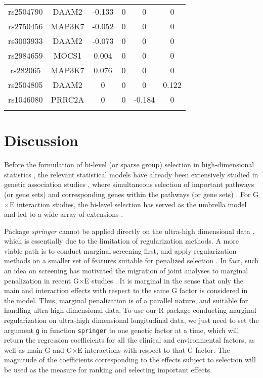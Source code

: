 \documentclass[12pt]{article}
\begin{document}
\begin{longtable} [ht!]{c c c c c c}
	rs2504790&DAAM2	&-0.133&	0&	0&	0\\
	
	rs2750456&MAP3K7	&-0.052&	0&	0&	0\\
	
	rs3003933&DAAM2	&-0.073&	0&	0&	0\\
	
	rs2984659&MOCS1	&0.004&	0&	0&	0\\
	
	rs282065&MAP3K7	&0.076&	0&	0&	0\\
	
	rs2504805&DAAM2	&0&	0&	0&	0.122\\
	
	rs1046080&PRRC2A	&0&	0&	-0.184&	0\\	
	\hline 
	\centering
\end{longtable}




\section{Discussion}

Before the formulation of bi-level (or sparse group) selection in high-dimensional statistics \cite{friedman2010note}, the relevant statistical models have already been extensively studied in genetic association studies \cite{lewis2002genetic,wu2012genetic}, where simultaneous selection of important pathways (or gene sets) and corresponding genes within the pathways (or gene sets) \cite{schaid2012using,wu2014boosting,jiang2017identification}. For G$\times$E interaction studies, the bi-level selection has served as the umbrella model and led to a wide array of extensions \cite{zhou2021gene}.  

Package \emph{springer} cannot be applied directly on the ultra-high dimensional data \cite{fan2008sure}, which is essentially due to the limitation of regularization methods. A more viable path is to conduct marginal screening first, and apply regularization methods on a smaller set of features suitable for penalized selection \cite{jiang20152higwas,li2015bayesian,wu2019selective}. In fact, such an idea on screening has motivated the migration of joint analyses to marginal penalization in recent G$\times$E studies \cite{chai2017identifying,lu2021identifying,wang2022overlapping}. It is marginal in the sense that only the main and interaction effects with respect to the same G factor is considered in the model. Thus, marginal penalization is of a parallel nature, and suitable for handling ultra-high dimensional data. To use our R package conducting marginal regularization on ultra-high dimensional longitudinal data, we just need to set the argument \texttt{g} in function \texttt{springer} to one genetic factor at a time, which will return the regression coefficients for all the clinical and environmental factors, as well as main G and G$\times$E interactions with respect to that G factor. The magnitude of the coefficients corresponding to the effects subject to selection will be used as the measure for ranking and selecting important effects.
\end{document}
